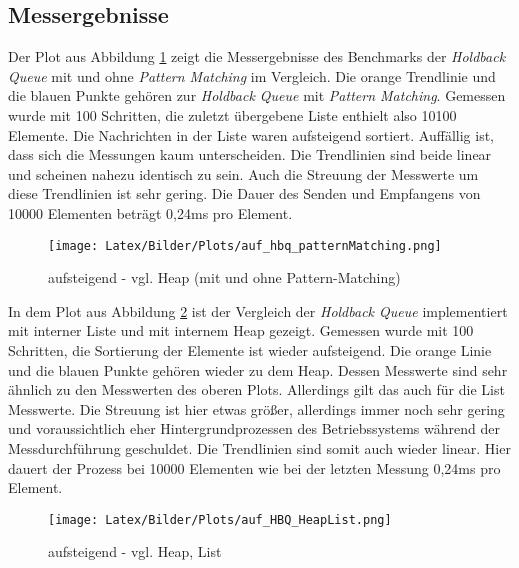 \subsection{Messergebnisse}

Der Plot aus Abbildung \ref{fig:auf_hbq_pattern} zeigt die Messergebnisse des Benchmarks der \textit{Holdback Queue} mit und ohne \textit{Pattern Matching} im Vergleich. Die orange Trendlinie und die blauen Punkte gehören zur \textit{Holdback Queue} mit \textit{Pattern Matching}. Gemessen wurde mit 100 Schritten, die zuletzt übergebene Liste enthielt also 10100 Elemente. Die Nachrichten in der Liste waren aufsteigend sortiert. Auffällig ist, dass sich die Messungen kaum unterscheiden. Die Trendlinien sind beide linear und scheinen nahezu identisch zu sein. Auch die Streuung der Messwerte um diese Trendlinien ist sehr gering. Die Dauer des Senden und Empfangens von 10000 Elementen beträgt 0,24ms pro Element.

\begin{figure}[htbp]
\begin{center}
\texttt{[image: Latex/Bilder/Plots/auf\_hbq\_patternMatching.png]}
\caption{\label{fig:auf_hbq_pattern} aufsteigend - vgl. Heap (mit und ohne Pattern-Matching)} 
\end{center}
\end{figure}

\newpage
In dem Plot aus Abbildung \ref{fig:auf_heapList} ist der Vergleich der \textit{Holdback Queue} implementiert mit interner Liste und mit internem Heap gezeigt. Gemessen wurde mit 100 Schritten, die Sortierung der Elemente ist wieder aufsteigend. Die orange Linie und die blauen Punkte gehören wieder zu dem Heap. Dessen Messwerte sind sehr ähnlich zu den Messwerten des oberen Plots. Allerdings gilt das auch für die List Messwerte. Die Streuung ist hier etwas größer, allerdings immer noch sehr gering und voraussichtlich eher Hintergrundprozessen des Betriebssystems während der Messdurchführung geschuldet. Die Trendlinien sind somit auch wieder linear. Hier dauert der Prozess bei 10000 Elementen wie bei der letzten Messung 0,24ms pro Element. 

\begin{figure}[htbp]
\begin{center}
\texttt{[image: Latex/Bilder/Plots/auf\_HBQ\_HeapList.png]}
\caption{\label{fig:auf_heapList} aufsteigend - vgl. Heap, List} 
\end{center}
\end{figure}

